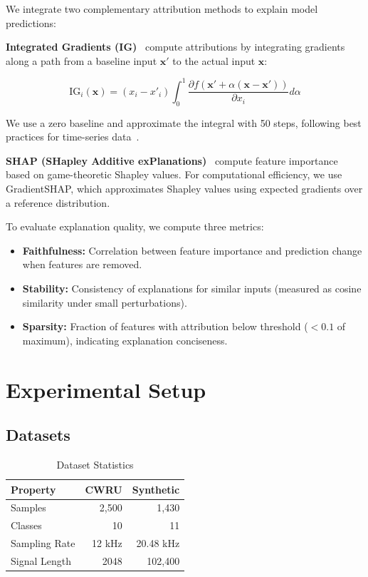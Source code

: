 \documentclass[journal]{IEEEtran}
\begin{document}
We integrate two complementary attribution methods to explain model predictions:

\textbf{Integrated Gradients (IG)}~\cite{sundararajan2017axiomatic} compute
attributions by integrating gradients along a path from a baseline input
$\mathbf{x}'$ to the actual input $\mathbf{x}$:

\begin{equation}
    \text{IG}_i(\mathbf{x}) = (x_i - x'_i) \int_0^1 \frac{\partial f(\mathbf{x}' + \alpha(\mathbf{x} - \mathbf{x}'))}{\partial x_i} d\alpha
\end{equation}

We use a zero baseline and approximate the integral with 50 steps, following
best practices for time-series data~\cite{ismail2020benchmarking}.

\textbf{SHAP (SHapley Additive exPlanations)}~\cite{lundberg2017shap} compute
feature importance based on game-theoretic Shapley values. For computational
efficiency, we use GradientSHAP, which approximates Shapley values using
expected gradients over a reference distribution.

To evaluate explanation quality, we compute three metrics:
\begin{itemize}
    \item \textbf{Faithfulness:} Correlation between feature importance and
    prediction change when features are removed.
    \item \textbf{Stability:} Consistency of explanations for similar inputs
    (measured as cosine similarity under small perturbations).
    \item \textbf{Sparsity:} Fraction of features with attribution below
    threshold ($< 0.1$ of maximum), indicating explanation conciseness.
\end{itemize}


\section{Experimental Setup}
\label{sec:experiments}

\subsection{Datasets}

\begin{table}[h]
\centering
\caption{Dataset Statistics}
\label{tab:dataset}
\begin{tabular}{lrr}
\toprule
\textbf{Property} & \textbf{CWRU} & \textbf{Synthetic} \\
\midrule
Samples & 2,500 & 1,430 \\
Classes & 10 & 11 \\
Sampling Rate & 12 kHz & 20.48 kHz \\
Signal Length & 2048 & 102,400 \\
\bottomrule
\end{tabular}
\end{table}
\end{document}

